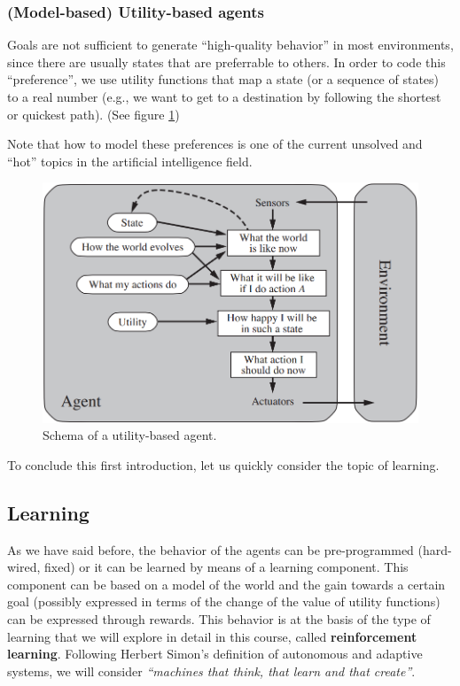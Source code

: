 \subsubsection{(Model-based) Utility-based agents}
Goals are not sufficient to generate “high-quality behavior” in most environments, since there are usually states that are preferrable to others. In order to code this “preference”, we use utility functions that map a state (or a sequence of states) to a real number (e.g., we want to get to a destination by following the shortest or quickest path). (See figure \ref{fig:ch1-utilitybasedagent})

Note that how to model these preferences is one of the current unsolved and “hot” topics in the artificial intelligence field.

\begin{figure}[hbt]
    \centering
    \includegraphics[scale=0.35]{Images/Chapter 1/utility-based-agent.png}
    \caption{Schema of a utility-based agent.}
    \label{fig:ch1-utilitybasedagent}
\end{figure}

To conclude this first introduction, let us quickly consider the topic of learning.

\subsection{Learning}
As we have said before, the behavior of the agents can be pre-programmed (hard-wired, fixed) or it can be learned by means of a learning component. This component can be based on a model of the world and the gain towards a certain goal (possibly expressed in terms of the change of the value of utility functions) can be expressed through rewards. This behavior is at the basis of the type of learning that we will explore in detail in this course, called \textbf{reinforcement learning}. Following Herbert Simon’s definition of autonomous and adaptive systems, we will consider \textit{``machines that think, that learn and that create''}.